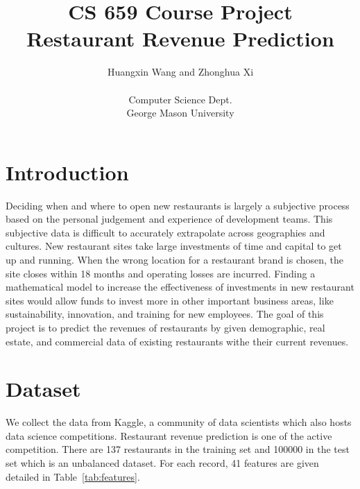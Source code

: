 \documentclass[10pt, oneside]{article}   	%
\title{CS 659 Course Project \\ Restaurant Revenue Prediction}
\author{Huangxin Wang and Zhonghua Xi \\
\\
Computer Science Dept. \\
George Mason University}
\newcommand\tabref{Table~\ref}
\begin{document}
\maketitle

\section{Introduction}
Deciding when and where to open new restaurants is largely a subjective process based on the personal judgement and experience of development teams. 
This subjective data is difficult to accurately extrapolate across geographies and cultures.
New restaurant sites take large investments of time and capital to get up and running. 
When the wrong location for a restaurant brand is chosen, the site closes within 18 months and operating losses are incurred. 
Finding a mathematical model to increase the effectiveness of investments in new restaurant sites would allow funds to invest more in other important business areas, like sustainability, innovation, and training for new employees.
The goal of this project is to predict the revenues of restaurants by given demographic, real estate, and commercial data of existing restaurants withe their current revenues.

\section{Dataset}
We collect the data from Kaggle, a community of data scientists which also hosts data science competitions. 
Restaurant revenue prediction is one of the active competition.
There are 137 restaurants in the training set and 100000 in the test set which is an unbalanced dataset. 
For each record, 41 features are given detailed in \tabref{tab:features}.
\end{document}
